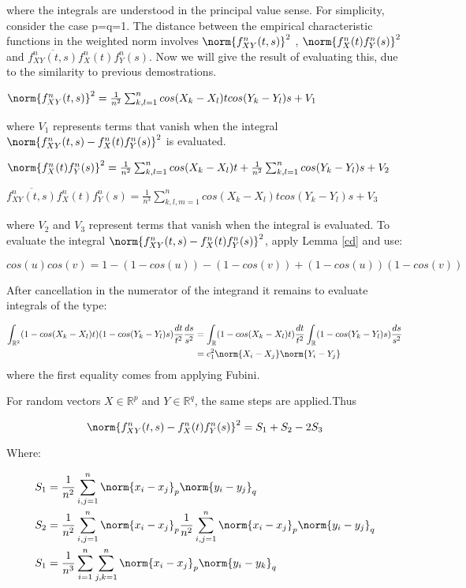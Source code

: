 where the integrals are understood in the principal value sense. For simplicity, consider the case p=q=1. The distance between the empirical characteristic functions in the weighted norm involves $\norm{f_{XY}^{n}(t,s)}^{2}$ , $\norm{f_{X}^{n}(t)f_{Y}^{n}(s)}^{2}$ and $\overline{f_{XY}^{n}(t,s)}f_{X}^{n}(t)f_{Y}^{n}(s)$.
Now we will give the result of evaluating this, due to the similarity to previous demostrations.

$\norm{f_{XY}^{n}(t,s)}^{2} = \frac{1}{n^{2}}\sum_{k,l=1}^{n} cos(X_{k}-X_{l})tcos(Y_{k}-Y_{l})s + V_{1}$

where $V_{1}$ represents terms that vanish when the integral $\norm{f_{XY}^{n}(t,s) - f_{X}^{n}(t)f_{Y}^{n}(s)}^{2}$ is evaluated.

$\norm{f_{X}^{n}(t)f_{Y}^{n}(s)}^{2} = \frac{1}{n^{2}}\sum_{k,l=1}^{n} cos(X_{k}-X_{l})t+ \frac{1}{n^{2}}\sum_{k,l=1}^{n}cos(Y_{k}-Y_{l})s + V_{2}$

$\overline{f_{XY}^{n}(t,s)}f_{X}^{n}(t)f_{Y}^{n}(s) = \frac{1}{n^{3}}\sum_{k,l,m=1}^{n} cos(X_{k}-X_{l})tcos(Y_{k}-Y_{l})s + V_{3}$


where $V_{2}$ and $V_{3}$ represent terms that vanish when the integral is evaluated. To evaluate the integral $\norm{f_{XY}^{n}(t,s) - f_{X}^{n}(t)f_{Y}^{n}(s)}^{2}$, apply Lemma \ref{cd} and use:

$$
cos(u)cos(v) = 1-(1-cos(u))-(1-cos(v))+(1-cos(u))(1-cos(v))
$$

After cancellation in the numerator of the integrand it remains to evaluate integrals of the type:

\begin{equation}{}
\begin{split}
\int_{\mathbb{R}^{2}}(1-cos(X_{k}-X_{l})t)(1-cos(Y_{k}-Y_{l})s)\frac{dt}{t^{2}}\frac{ds}{s^{2}} &
= \int_{\mathbb{R}}(1-cos(X_{k}-X_{l})t)\frac{dt}{t^{2}}\int_{\mathbb{R}}(1-cos(Y_{k}-Y_{l})s)\frac{ds}{s^{2}} \\
&= c_{1}^{2}\norm{X_{i}-X_{j}}\norm{Y_{i}-Y_{j}}
\end{split}
\end{equation}
where the first equality comes from applying Fubini.

For random vectors $X\in\mathbb{R}^{p}$ and $Y\in\mathbb{R}^{q}$, the same steps are applied.Thus

$$
\norm{f_{XY}^{n}(t,s) - f_{X}^{n}(t)f_{Y}^{n}(s)}^{2} = S_{1} +S_{2}-2S_{3}
$$

Where:

\begin{equation}{}
\begin{split}
& S_{1} =\frac{1}{n^{2}} \sum_{i,j=1}^{n}\norm{x_{i}-x_{j}}_{p}\norm{y_{i}-y_{j}}_{q} \\
& S_{2} =\frac{1}{n^{2}} \sum_{i,j=1}^{n}\norm{x_{i}-x_{j}}_{p}\frac{1}{n^{2}} \sum_{i,j=1}^{n}\norm{x_{i}-x_{j}}_{p}\norm{y_{i}-y_{j}}_{q} \\
&S_{1} =\frac{1}{n^{3}} \sum_{i=1}^{n}\sum_{j,k=1}^{n}\norm{x_{i}-x_{j}}_{p}\norm{y_{i}-y_{k}}_{q}
\end{split}
\end{equation}

